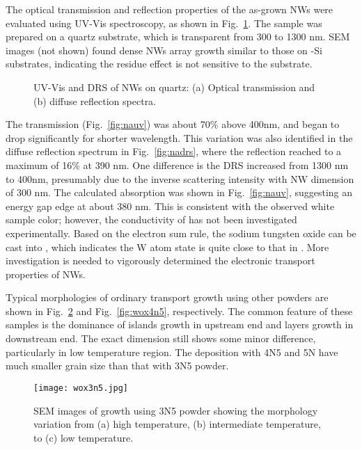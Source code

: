 The optical transmission and reflection properties of the as-grown  NWs were evaluated using UV-Vis spectroscopy, as shown in Fig.~\ref{fig:ch3naxuvvis}. The sample was prepared on a quartz substrate, which is transparent from 300 to 1300 nm. SEM images (not shown) found dense NWs array growth similar to those on -Si substrates, indicating the residue effect is not sensitive to the substrate. 
\begin{figure}[htb]
\centering
{}\hspace{0.04\textwidth}
\caption[UV-Vis and \gls{drs} of  NWs on quartz]{UV-Vis and DRS of  NWs on quartz: (a) Optical transmission and (b) diffuse reflection spectra.}
\label{fig:ch3naxuvvis}
\end{figure}
The transmission (Fig.~\ref{fig:nauv}) was about 70\% above 400nm, and began to drop significantly for shorter wavelength. This variation was also identified in the diffuse reflection spectrum in Fig.~\ref{fig:nadrs}, where the reflection reached to a maximum of 16\% at 390 nm. One difference is the DRS increased from 1300 nm to 400nm, presumably due to the inverse scattering intensity with NW dimension of 300 nm. The calculated absorption was shown in Fig.~\ref{fig:nauv}, suggesting an energy gap edge at about 380 nm. This is consistent with the observed white sample color; however, the conductivity of  has not been investigated experimentally. Based on the electron sum rule, the sodium tungsten oxide can be cast into , which indicates the W atom state is quite close to that in . More investigation is needed to vigorously determined the electronic transport properties of  NWs. 

Typical morphologies of ordinary transport growth using other powders are shown in Fig.~\ref{fig:wox3n5} and Fig.~\ref{fig:wox4n5}, respectively. The common feature of these samples is the dominance of islands growth in upstream end and layers growth in downstream end. The exact dimension still shows some minor difference, particularly in low temperature region. The deposition with 4N5 and 5N have much smaller grain size than that with 3N5 powder.
\begin{figure}[htb]
\centering
\texttt{[image: wox3n5.jpg]}
\caption[SEM images of  growth using 3N5 powder]{SEM images of  growth using 3N5 powder showing the morphology variation from (a) high temperature, (b) intermediate temperature, to (c) low temperature.}
\label{fig:wox3n5}
\end{figure}

